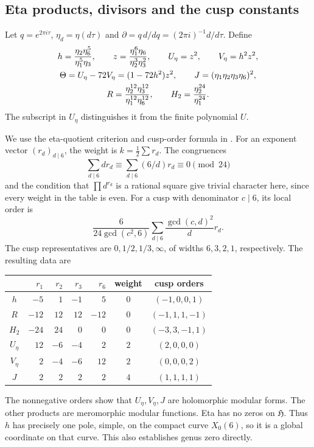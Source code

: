 \documentclass[11pt,a4paper]{article}
\theoremstyle{remark}
\newcommand{\HH}{\mathfrak H}\newcommand{\dd}{\partial}
\begin{document}
\subsection{Eta products, divisors and the cusp constants}
Let $q=e^{2\pi i\tau}$, $\eta_d=\eta(d\tau)$ and
$\dd=q\,d/dq=(2\pi i)^{-1}d/d\tau$. Define
\begin{gather}
 h=\frac{\eta_2\eta_6^5}{\eta_1^5\eta_3},\qquad
 z=\frac{\eta_1^6\eta_6}{\eta_2^3\eta_3^2},\qquad
 U_\eta=z^2,\qquad V_\eta=h^2z^2,\notag\\
 \Theta=U_\eta-72V_\eta=(1-72h^2)z^2,\qquad
 J=(\eta_1\eta_2\eta_3\eta_6)^2,\notag\\
 R=\frac{\eta_2^{12}\eta_3^{12}}{\eta_1^{12}\eta_6^{12}},\qquad
 H_2=\frac{\eta_2^{24}}{\eta_1^{24}}.\label{eq:eta-products}
\end{gather}
The subscript in $U_\eta$ distinguishes it from the finite polynomial $U$.

We use the eta-quotient criterion and cusp-order formula in
\cite[p.~2]{rousewebb}. For an exponent vector $(r_d)_{d\mid6}$,
the weight is $k=\frac12\sum r_d$. The congruences
\[
 \sum_{d\mid6}d r_d\equiv\sum_{d\mid6}(6/d)r_d\equiv0\pmod{24}
\]
and the condition that $\prod d^{r_d}$ is a rational square give
trivial character here, since every weight in the table is even.
For a cusp with denominator $c\mid6$, its local order is
\begin{equation}\label{eq:Ligozat}
 \frac{6}{24\gcd(c^2,6)}
 \sum_{d\mid6}\frac{\gcd(c,d)^2}{d}r_d.
\end{equation}
The cusp representatives are $0,1/2,1/3,\infty$, of widths
$6,3,2,1$, respectively. The resulting data are
\begin{center}\small
\begin{tabular}{c rrrr c c}
\toprule
 & $r_1$ & $r_2$ & $r_3$ & $r_6$ & weight & cusp orders\\
\midrule
$h$ & $-5$ & $1$ & $-1$ & $5$ & $0$ & $(-1,0,0,1)$\\
$R$ & $-12$ & $12$ & $12$ & $-12$ & $0$ & $(-1,1,1,-1)$\\
$H_2$ & $-24$ & $24$ & $0$ & $0$ & $0$ & $(-3,3,-1,1)$\\
$U_\eta$ & $12$ & $-6$ & $-4$ & $2$ & $2$ & $(2,0,0,0)$\\
$V_\eta$ & $2$ & $-4$ & $-6$ & $12$ & $2$ & $(0,0,0,2)$\\
$J$ & $2$ & $2$ & $2$ & $2$ & $4$ & $(1,1,1,1)$\\
\bottomrule
\end{tabular}
\end{center}
The nonnegative orders show that $U_\eta,V_\eta,J$ are holomorphic
modular forms. The other products are meromorphic modular functions.
Eta has no zeros on $\HH$. Thus $h$ has precisely one pole, simple,
on the compact curve $X_0(6)$, so it is a global coordinate on that
curve. This also establishes genus zero directly.
\end{document}
